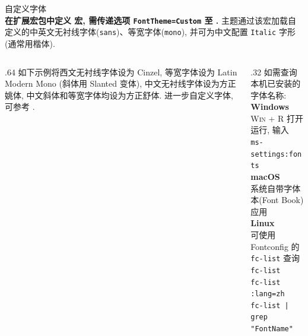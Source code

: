 \begin{frame}{自定义字体 }\label{goto:CustomFontTheme}
  \\[.5ex]
  \textbf{在扩展宏包中定义  宏, 需传递选项 \texttt{FontTheme=Custom} 至 .} 主题通过该宏加载自定义的中英文无衬线字体(\texttt{sans})、等宽字体(\texttt{mono}), 并可为中文配置 \texttt{Italic} 字形(通常用楷体).\medskip

  \begin{columns}[T, onlytextwidth]
    \begin{column}{.64\textwidth}
      如下示例将西文无衬线字体设为 Cinzel, 等宽字体设为 Latin Modern Mono (斜体用 Slanted 变体), 中文无衬线字体设为方正姚体, 中文斜体和等宽字体均设为方正舒体. 进一步自定义字体, 可参考 .\\[.5ex]
      \bigskip
    \end{column}\qquad
    \begin{column}{.32\textwidth}
      如需查询本机已安装的字体名称:\\[1ex]
      \textbf{Windows}\\
      \textsc{Win + R} 打开运行, 输入 \texttt{ms-settings:fonts}\\[.5ex]
      \textbf{macOS}\\
      系统自带字体本(Font Book)应用\\[.5ex]
      \textbf{Linux}\\
      可使用 Fontconfig 的 \texttt{fc-list} 查询\\
      \texttt{fc-list}\\
      \texttt{fc-list :lang=zh}\\
      \texttt{fc-list | grep "FontName"}
    \end{column}
  \end{columns}
  

\end{frame}
